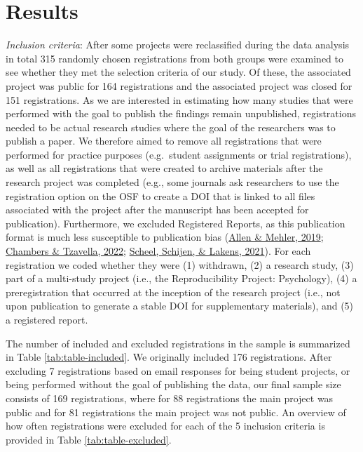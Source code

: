 \documentclass[
  ,jou, a4paper,floatsintext]{apa6}
\begin{document}
\hypertarget{results}{%
\section{Results}\label{results}}

\emph{Inclusion criteria}: After some projects were reclassified during the data analysis in total 315 randomly chosen registrations from both groups were examined to see whether they met the selection criteria of our study. Of these, the associated project was public for 164 registrations and the associated project was closed for 151 registrations. As we are interested in estimating how many studies that were performed with the goal to publish the findings remain unpublished, registrations needed to be actual research studies where the goal of the researchers was to publish a paper. We therefore aimed to remove all registrations that were performed for practice purposes (e.g.~student assignments or trial registrations), as well as all registrations that were created to archive materials after the research project was completed (e.g., some journals ask researchers to use the registration option on the OSF to create a DOI that is linked to all files associated with the project after the manuscript has been accepted for publication). Furthermore, we excluded Registered Reports, as this publication format is much less susceptible to publication bias (\protect\hyperlink{ref-allen_open_2019}{Allen \& Mehler, 2019}; \protect\hyperlink{ref-chambers_past_2022}{Chambers \& Tzavella, 2022}; \protect\hyperlink{ref-scheel_excess_2021}{Scheel, Schijen, \& Lakens, 2021}). For each registration we coded whether they were (1) withdrawn, (2) a research study, (3) part of a multi-study project (i.e., the Reproducibility Project: Psychology), (4) a preregistration that occurred at the inception of the research project (i.e., not upon publication to generate a stable DOI for supplementary materials), and (5) a registered report.

The number of included and excluded registrations in the sample is summarized in Table \ref{tab:table-included}. We originally included 176 registrations. After excluding 7 registrations based on email responses for being student projects, or being performed without the goal of publishing the data, our final sample size consists of 169 registrations, where for 88 registrations the main project was public and for 81 registrations the main project was not public. An overview of how often registrations were excluded for each of the 5 inclusion criteria is provided in Table \ref{tab:table-excluded}.
\end{document}
